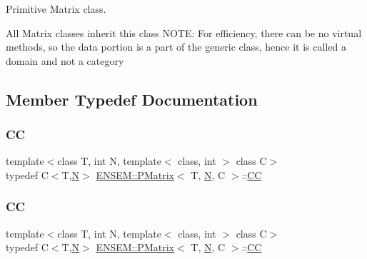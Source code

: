 Primitive Matrix class. 

All Matrix classes inherit this class N\+O\+TE\+: For efficiency, there can be no virtual methods, so the data portion is a part of the generic class, hence it is called a domain and not a category 

\subsection{Member Typedef Documentation}
\mbox{\label{classENSEM_1_1PMatrix_a744bac549029029effe32dc1705660ec}} 
\subsubsection{\texorpdfstring{CC}{CC}\hspace{0.1cm}{\footnotesize\ttfamily [1/2]}}
{\footnotesize\ttfamily template$<$class T, int N, template$<$ class, int $>$ class C$>$ \\
typedef C$<$T,\mbox{\hyperlink{operator__name__util_8cc_a7722c8ecbb62d99aee7ce68b1752f337}{N}}$>$ \mbox{\hyperlink{classENSEM_1_1PMatrix}{E\+N\+S\+E\+M\+::\+P\+Matrix}}$<$ T, \mbox{\hyperlink{operator__name__util_8cc_a7722c8ecbb62d99aee7ce68b1752f337}{N}}, C $>$\+::\mbox{\hyperlink{classENSEM_1_1PMatrix_a744bac549029029effe32dc1705660ec}{CC}}}

\mbox{\label{classENSEM_1_1PMatrix_a744bac549029029effe32dc1705660ec}} 
\subsubsection{\texorpdfstring{CC}{CC}\hspace{0.1cm}{\footnotesize\ttfamily [2/2]}}
{\footnotesize\ttfamily template$<$class T, int N, template$<$ class, int $>$ class C$>$ \\
typedef C$<$T,\mbox{\hyperlink{operator__name__util_8cc_a7722c8ecbb62d99aee7ce68b1752f337}{N}}$>$ \mbox{\hyperlink{classENSEM_1_1PMatrix}{E\+N\+S\+E\+M\+::\+P\+Matrix}}$<$ T, \mbox{\hyperlink{operator__name__util_8cc_a7722c8ecbb62d99aee7ce68b1752f337}{N}}, C $>$\+::\mbox{\hyperlink{classENSEM_1_1PMatrix_a744bac549029029effe32dc1705660ec}{CC}}}



